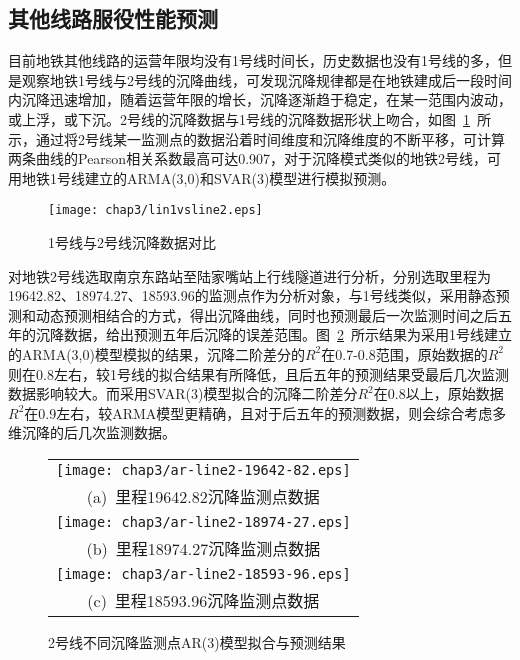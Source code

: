 \subsection{其他线路服役性能预测}

目前地铁其他线路的运营年限均没有1号线时间长，历史数据也没有1号线的多，但是观察地铁1号线与2号线的沉降曲线，可发现沉降规律都是在地铁建成后一段时间内沉降迅速增加，随着运营年限的增长，沉降逐渐趋于稳定，在某一范围内波动，或上浮，或下沉。2号线的沉降数据与1号线的沉降数据形状上吻合，如图~\ref{fig:1号线与2号线沉降数据对比}~所示，通过将2号线某一监测点的数据沿着时间维度和沉降维度的不断平移，可计算两条曲线的Pearson相关系数最高可达0.907，对于沉降模式类似的地铁2号线，可用地铁1号线建立的ARMA(3,0)和SVAR(3)模型进行模拟预测。

\begin{figure}[htb!]
    \centering
    \texttt{[image: chap3/lin1vsline2.eps]}
    \caption{1号线与2号线沉降数据对比}
    \label{fig:1号线与2号线沉降数据对比}
\end{figure}

对地铁2号线选取南京东路站至陆家嘴站上行线隧道进行分析，分别选取里程为19642.82、18974.27、18593.96的监测点作为分析对象，与1号线类似，采用静态预测和动态预测相结合的方式，得出沉降曲线，同时也预测最后一次监测时间之后五年的沉降数据，给出预测五年后沉降的误差范围。图~\ref{fig:2号线不同沉降监测点AR3模型拟合与预测结果}~所示结果为采用1号线建立的ARMA(3,0)模型模拟的结果，沉降二阶差分的$R^2$在0.7-0.8范围，原始数据的$R^2$则在0.8左右，较1号线的拟合结果有所降低，且后五年的预测结果受最后几次监测数据影响较大。而采用SVAR(3)模型拟合的沉降二阶差分$R^2$在0.8以上，原始数据$R^2$在0.9左右，较ARMA模型更精确，且对于后五年的预测数据，则会综合考虑多维沉降的后几次监测数据。

\begin{figure}[htbp] 
    \centering 
    \begin{tabular}{c} 
        \texttt{[image: chap3/ar-line2-19642-82.eps]} \\ 
        (a)~里程19642.82沉降监测点数据 \\
        \texttt{[image: chap3/ar-line2-18974-27.eps]} \\ 
        (b)~里程18974.27沉降监测点数据 \\
        \texttt{[image: chap3/ar-line2-18593-96.eps]} \\ 
        (c)~里程18593.96沉降监测点数据 \\
    \end{tabular}
    \caption{2号线不同沉降监测点AR(3)模型拟合与预测结果} 
    \label{fig:2号线不同沉降监测点AR3模型拟合与预测结果} 
\end{figure}

